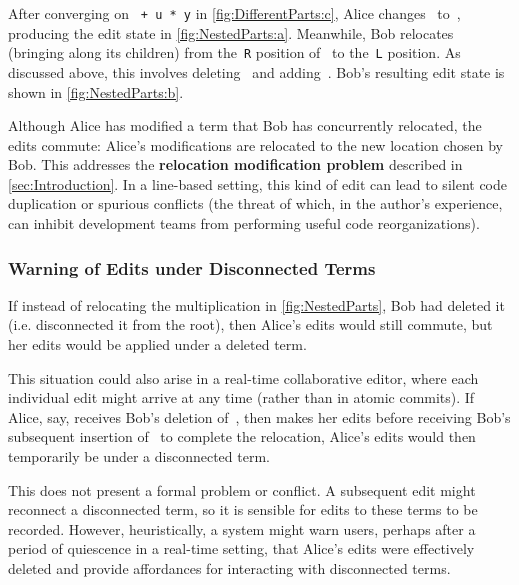 After converging on \texttt{\hole{} + u * y} in \autoref{fig:DifferentParts:c}, 
Alice changes~\vDifferentPartsAlice{} to~\vNestedPartsAlice{},
producing the edit state in \autoref{fig:NestedParts:a}.
Meanwhile, Bob relocates~\vSimpleTimes{} (bringing along its children)
from the~\texttt{R} position of~\vWrapPlus{} to the~\texttt{L} position. As discussed above, this involves deleting~\eMoveTimes{} and adding~\eNestedPartsBob{}.
Bob's resulting edit state is shown in \autoref{fig:NestedParts:b}.\todo{}

Although Alice has modified a term that Bob has concurrently relocated, the edits commute: Alice's modifications are relocated to the new location chosen by Bob.
This addresses the \textbf{relocation modification problem} described in \autoref{sec:Introduction}.
In a line-based setting, this kind of edit can lead to silent code duplication or spurious conflicts (the threat of which, in the author's experience, can inhibit development teams from performing useful code reorganizations).


\subsubsection{Warning of Edits under Disconnected Terms}

If instead of relocating the multiplication in \autoref{fig:NestedParts}, Bob had deleted it (i.e. disconnected it from the root), then Alice's edits would still commute, but her edits would be applied under a deleted term. 

This situation could also arise in a real-time collaborative editor, where each individual edit might arrive at any time (rather than in atomic commits). If Alice, say, receives Bob's deletion of~\eMoveTimes{}, then makes her edits 
before receiving Bob's subsequent insertion of~\eNestedPartsBob{} to complete the relocation, 
Alice's edits would then temporarily be under a disconnected term. 

This does not present a formal problem or conflict. A subsequent edit might reconnect a disconnected term, so it is sensible for edits to these terms to be recorded. 
However, heuristically, a system might warn users, perhaps after a period of quiescence in a real-time setting, that Alice's edits were effectively deleted and provide affordances for interacting with disconnected terms.


